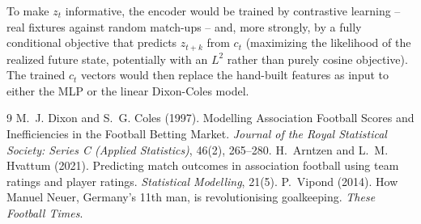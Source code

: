 \documentclass{article}
\begin{document}
To make $z_t$ informative, the encoder would be trained by contrastive learning -- real fixtures against random match-ups -- and, more strongly, by a fully conditional objective that predicts $z_{t+k}$ from $c_t$ (maximizing the likelihood of the realized future state, potentially with an $L^2$ rather than purely cosine objective). The trained $c_t$ vectors would then replace the hand-built features as input to either the MLP or the linear Dixon-Coles model.

\begin{thebibliography}{9}
 M.~J. Dixon and S.~G. Coles (1997). Modelling Association Football Scores and Inefficiencies in the Football Betting Market. \textit{Journal of the Royal Statistical Society: Series C (Applied Statistics)}, 46(2), 265--280.
 H.~Arntzen and L.~M. Hvattum (2021). Predicting match outcomes in association football using team ratings and player ratings. \textit{Statistical Modelling}, 21(5).
 P.~Vipond (2014). How Manuel Neuer, Germany's 11th man, is revolutionising goalkeeping. \textit{These Football Times}.
\end{thebibliography}
\end{document}

